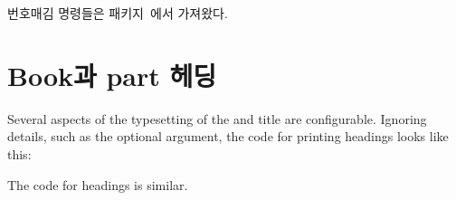 번호매김 명령들은  패키지~\cite{TOCVSEC2}에서 가져왔다.

\section{Book과 part 헤딩}



    Several aspects of the typesetting of the \cmd{\book} and \cmd{\part}
title are configurable. Ignoring details, such as the optional argument,
the code for printing \cmd{\part} headings looks like this:
\begin{lcode}
\newcommand{\part}[1]{%
  \cleardoublepage         %
  \thispagestyle{part}     %
  \beforepartskip          %
  \printpartname\partnamenum\printpartnum
  \midpartskip             %
  \printparttitle{#1}      %
  \partpageend}            %
\newcommand{\partpageend}{%
  \afterpartskip
  }
\end{lcode}
The code for \cmd{\book} headings is similar.

